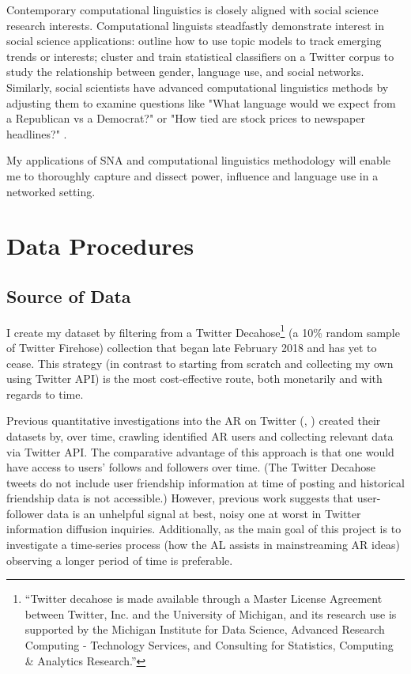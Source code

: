 \documentclass[acmlarge, screen, authorversion]{acmart}
\begin{document}
Contemporary computational linguistics is closely aligned with social science
research interests. Computational linguists steadfastly demonstrate interest in
social science applications: \citep{lauOnlineTrendAnalysis} outline how to use
topic models to track emerging trends or interests;
\cite{bammanGenderIdentityLexical2014} cluster and train statistical classifiers
on a Twitter corpus to study the relationship between gender, language use, and
social networks. Similarly, social scientists have advanced computational
linguistics methods by adjusting them to examine questions like "What language
would we expect from a Republican vs a Democrat?" or "How tied are stock prices
to newspaper headlines?"  \cite{monroeFightinWordsLexical2008,
gentzkowTextData2019}.

My applications of SNA and computational linguistics methodology will enable me to thoroughly capture and dissect power, influence and language use in a networked setting.

\section{Data Procedures}

\subsection{Source of Data}

I create my dataset by filtering from a Twitter Decahose\footnote{“Twitter
decahose is made available through a Master License Agreement between Twitter,
Inc. and the University of Michigan, and its research use is supported by the
Michigan Institute for Data Science, Advanced Research Computing - Technology
Services, and Consulting for Statistics, Computing \& Analytics Research.”} (a
10\% random sample of Twitter Firehose) collection that began late February 2018
and has yet to cease. This strategy (in contrast to starting from scratch and
collecting my own using Twitter API) is the most cost-effective route, both
monetarily and with regards to time.

Previous quantitative investigations into the AR on Twitter
(\cite{bergerAltrightTwitterCensus2018},
\cite{alizadehPsychologyMoralityPolitical2019}) created their datasets by, over
time, crawling identified AR users and collecting relevant data via Twitter API.
The comparative advantage of this approach is that one would have access to
users' follows and followers over time. (The Twitter Decahose tweets do not
include user friendship information at time of posting and historical friendship
data is not accessible.) However, previous work
\cite{chaMeasuringUserInfluence2010,
versteegInformationtheoreticMeasuresInfluence2013} suggests that user-follower
data is an unhelpful signal at best, noisy one at worst in Twitter information
diffusion inquiries. Additionally, as the main goal of this project is to
investigate a time-series process (how the AL assists in mainstreaming AR ideas)
observing a longer period of time is preferable.
\end{document}
